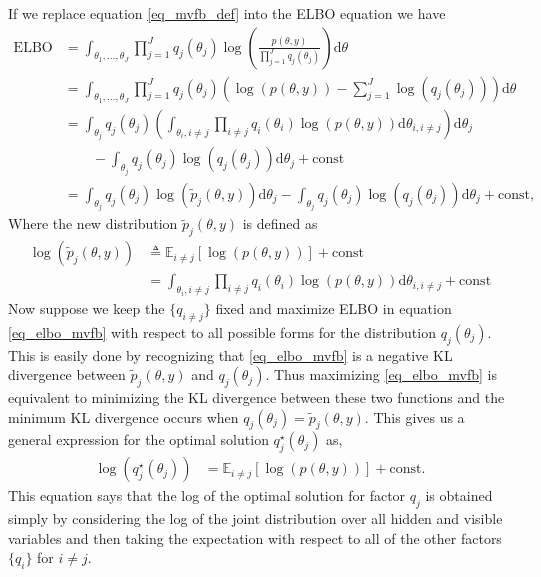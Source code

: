 \documentclass[10pt ]{article}
\begin{document}
If we replace equation \eqref{eq_mvfb_def} into the ELBO equation we have
\begin{align}
\mathrm{ELBO} &= \int_{\theta_1, \dots, \theta_J}  \prod_{j=1}^J q_j(\theta_j) \log \left(\frac{p(\theta, y) }{\prod_{j=1}^J q_j(\theta_j)} \right) \mathrm{d}\theta \nonumber \\
 &=  \int_{\theta_1, \dots, \theta_J}   \prod_{j=1}^J q_j(\theta_j) \left( \log(p(\theta, y)) - \sum_{j=1}^J \log \left( q_j (\theta_j)\right)\right) \mathrm{d}\theta  \nonumber \\
& = \int_{\theta_j}  q_j(\theta_j)   \left( \int_{\theta_i, i\neq j}   \prod_{i \neq j} q_i(\theta_i) \log(p(\theta, y)) \mathrm{d} \theta_{i, i \neq j} \right) \mathrm{d} \theta_j \nonumber \\
&\qquad - \int_{\theta_j}  q_j(\theta_j)  \log  \left(   q_j(\theta_j) \right) \mathrm{d} \theta_j + \mathrm{const} \nonumber \\
& = \int_{\theta_j} q_j ( \theta_j) \log \left( \tilde{p}_j(\theta, y) \right) \mathrm{d} \theta_j  - \int_{\theta_j}  q_j(\theta_j)  \log  \left(   q_j(\theta_j) \right) \mathrm{d} \theta_j + \mathrm{const},
\label{eq_elbo_mvfb}
\end{align}
Where the new distribution $\tilde{p}_j(\theta, y)$ is defined as
\begin{align}
\log \left( \tilde{p}_j(\theta, y) \right) &\triangleq \mathbb{E}_{i \neq j} \left[ \log \left( p(\theta, y) \right) \right] + \mathrm{const} \nonumber \\
&=  \int_{\theta_i, i\neq j}   \prod_{i \neq j} q_i(\theta_i) \log(p(\theta, y)) \mathrm{d} \theta_{i, i \neq j}  + \mathrm{const}
\label{eq_new_elbo_dist}
\end{align}
Now suppose we keep the $\{ q_{i \neq j} \}$ fixed and maximize ELBO in equation \eqref{eq_elbo_mvfb} with respect to all possible forms for the distribution $q_j(\theta_j)$. This is easily done by recognizing that  \eqref{eq_elbo_mvfb} is a negative KL divergence between $ \tilde{p}_j(\theta, y)  $ and $q_j(\theta_j)$. Thus maximizing \eqref{eq_elbo_mvfb}  is equivalent to minimizing the KL divergence between these two functions and the minimum KL divergence occurs when $ q_j(\theta_j) =  \tilde{p}_j(\theta, y) $. This gives us a general expression for the optimal solution $q_{j}^{\star} \left( \theta_j \right)$ as,
\begin{align}
\log \left( q_{j}^{\star} \left( \theta_j \right) \right) &= \mathbb{E}_{i \neq j} \left[ \log \left( p(\theta, y) \right) \right] + \mathrm{const}.
\label{eq_optimal_mvfb}
\end{align}
This equation says that the log of the optimal solution for factor $q_j$ is obtained simply by considering the log of the joint distribution over all hidden and visible variables and then taking the expectation with respect to all of the other factors $\{ q_i \}$ for $i \neq j$. 
\end{document}
